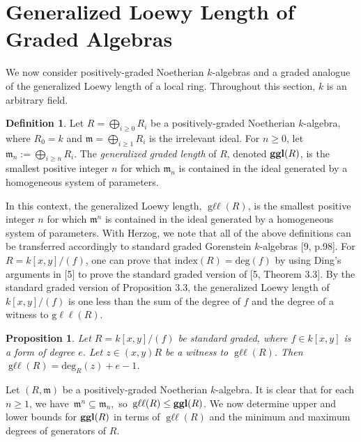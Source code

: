 \documentclass{amsart}
\newtheorem{proposition}[theorem]{Proposition}
\theoremstyle{definition}
\theoremstyle{definition}
\newtheorem{definition}[theorem]{Definition}
\DeclareMathOperator{\gll}{\text{g}\ell\ell}
\DeclareMathOperator{\ggl}{\bf{ggl}}
\numberwithin{equation}{section}
\theoremstyle{definition}
\begin{document}
{\section{\large{Generalized Loewy Length of Graded Algebras}}  
We now consider positively-graded Noetherian $k$-algebras and a graded analogue of the generalized Loewy length of a local ring. Throughout this section, $k$ is an arbitrary field. \newline
\begin{definition}
Let $R=\bigoplus\limits_{i \geq 0}R_{i}$ be a positively-graded Noetherian $k$-algebra, where $R_{0}=k$ and $\mathfrak{m}=\bigoplus\limits_{i \geq 1}R_{i}$ is the irrelevant ideal. For $n \geq 0$, let $\mathfrak{m}_{n}:=\bigoplus\limits_{i \geq n}R_{i}$. The {\it{generalized graded length}} of $R$, denoted $\ggl(R)$, is the smallest positive integer $n$ for which $\mathfrak{m}_{n}$ is contained in the ideal generated by a homogeneous system of parameters.\end{definition}\text{}\newline
In this context, the generalized Loewy length, $\gll(R)$, is the smallest positive integer $n$ for which $\mathfrak{m}^{n}$ is contained in the ideal generated by a homogeneous system of parameters.\newline\newline
With Herzog, we note that all of the above definitions can be transferred accordingly to standard graded Gorenstein $k$-algebras [9, p.98]. For $R=k[x,y]/(f)$, one can prove that $\text{index}(R)=\text{deg}(f)$ by using Ding's arguments in [5] to prove the standard graded version of [5, Theorem 3.3]. By the standard graded version of Proposition 3.3, the generalized Loewy length of $k[x,y]/(f)$ is one less than the sum of the degree of $f$ and the degree of a witness to $\text{g}\ell\ell(R)$.\newline 
\begin{proposition}
Let $R=k[x,y]/(f)$ be standard graded, where $f\in k[x,y]$ is a form of degree $e$. Let $z \in (x,y)R$ be a witness to $\gll(R)$. Then $\gll(R)=\text{deg}_{R}(z)+e-1$.\end{proposition}\text{}
\newline 
Let $(R,\mathfrak{m})$ be a positively-graded Noetherian $k$-algebra. It is clear that for each $n \geq 1$, we have \,$\mathfrak{m}^{n} \subseteq \mathfrak{m}_{n}$,\, so\, $\gll(R) \leq \ggl(R)$. We now determine upper and lower bounds for $\ggl(R)$ in terms of $\gll(R)$ and the minimum and maximum degrees of generators of $R$.\newline
}
\end{document}
